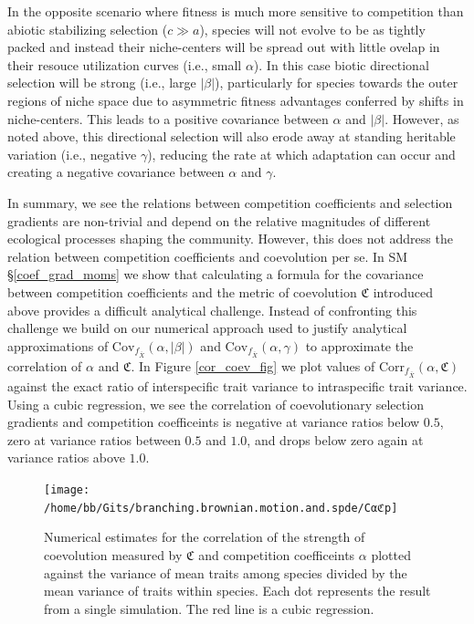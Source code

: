 \documentclass[]{elsarticle} %
\begin{document}
In the opposite scenario where fitness is much more sensitive to
competition than abiotic stabilizing selection (\(c\gg a\)), species
will not evolve to be as tightly packed and instead their niche-centers
will be spread out with little ovelap in their resouce utilization
curves (i.e., small \(\alpha\)). In this case biotic directional
selection will be strong (i.e., large \(|\beta|\)), particularly for
species towards the outer regions of niche space due to asymmetric
fitness advantages conferred by shifts in niche-centers. This leads to a
positive covariance between \(\alpha\) and \(|\beta|\). However, as
noted above, this directional selection will also erode away at standing
heritable variation (i.e., negative \(\gamma\)), reducing the rate at
which adaptation can occur and creating a negative covariance between
\(\alpha\) and \(\gamma\).

In summary, we see the relations between competition coefficients and
selection gradients are non-trivial and depend on the relative
magnitudes of different ecological processes shaping the community.
However, this does not address the relation between competition
coefficients and coevolution per se. In SM \S\ref{coef_grad_moms} we
show that calculating a formula for the covariance between competition
coefficients and the metric of coevolution \(\mathfrak{C}\) introduced
above provides a difficult analytical challenge. Instead of confronting
this challenge we build on our numerical approach used to justify
analytical approximations of
\(\mathrm{Cov}_{f_{\bar X}}(\alpha,|\beta|)\) and
\(\mathrm{Cov}_{f_{\bar X}}(\alpha,\gamma)\) to approximate the
correlation of \(\alpha\) and \(\mathfrak{C}\). In Figure
\ref{cor_coev_fig} we plot values of
\(\mathrm{Corr}_{f_{\bar X}}(\alpha,\mathfrak{C})\) against the exact
ratio of interspecific trait variance to intraspecific trait variance.
Using a cubic regression, we see the correlation of coevolutionary
selection gradients and competition coefficeints is negative at variance
ratios below \(0.5\), zero at variance ratios between \(0.5\) and
\(1.0\), and drops below zero again at variance ratios above \(1.0\).

\begin{figure}

{\centering \texttt{[image: /home/bb/Gits/branching.brownian.motion.and.spde/Cαℭp]} 

}

\caption{\label{cor_coev_fig}Numerical estimates for the correlation of the strength of coevolution measured by $\mathfrak{C}$ and competition coefficeints $\alpha$ plotted against the variance of mean traits among species divided by the mean variance of traits within species. Each dot represents the result from a single simulation. The red line is a cubic regression.}\label{fig:unnamed-chunk-12}
\end{figure}
\end{document}
